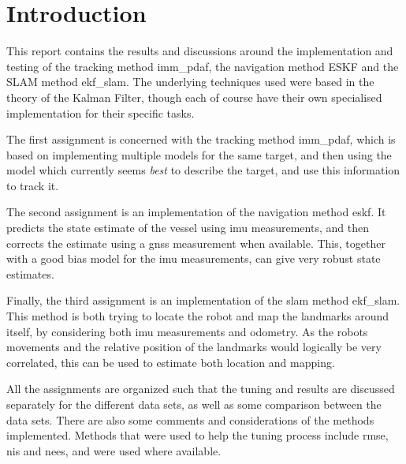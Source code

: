 \section{Introduction}\label{sec:intro}


This report contains the results and discussions around the implementation and testing of the tracking method \acrfull{imm_pdaf}, the navigation method ESKF and the SLAM method \acrfull{ekf_slam}. The underlying techniques used were based in the theory of the Kalman Filter, though each of course have their own specialised implementation for their specific tasks. 

The first assignment is concerned with the tracking method \acrshort{imm_pdaf}, which is based on implementing multiple models for the same target, and then using the model which currently seems \textit{best} to describe the target, and use this information to track it. 

The second assignment is an implementation of the navigation method \acrshort{eskf}. It predicts the state estimate of the vessel using \acrfull{imu} measurements, and then corrects the estimate using a \acrfull{gnss} measurement when available. This, together with a good bias model for the \acrshort{imu} measurements, can give very robust state estimates. 

Finally, the third assignment is an implementation of the \acrshort{slam} method \acrshort{ekf_slam}. This method is both trying to locate the robot and map the landmarks around itself, by considering both \acrshort{imu} measurements and odometry. As the robots movements and the relative position of the landmarks would logically be very correlated, this can be used to estimate both location and mapping. 

All the assignments are organized such that the tuning and results are discussed separately for the different data sets, as well as some comparison between the data sets. There are also some comments and considerations of the methods implemented. Methods that were used to help the tuning process include \acrfull{rmse}, \acrfull{nis} and \acrfull{nees}, and were used where available.







